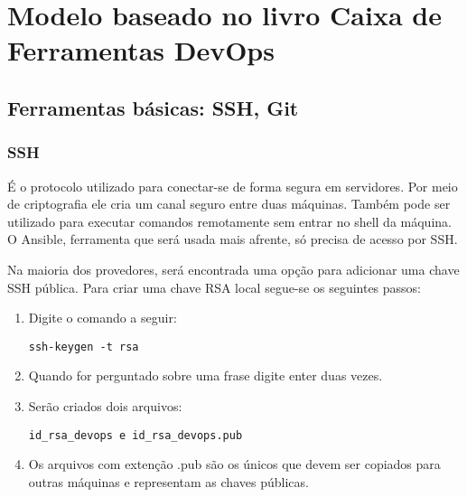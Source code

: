 

 

\section{Modelo baseado no livro Caixa de Ferramentas DevOps}

\subsection{Ferramentas básicas: SSH, Git}

\subsubsection{SSH}

É o protocolo utilizado para conectar-se de forma 
segura em servidores. Por meio de criptografia ele 
cria um canal seguro entre duas máquinas. Também 
pode ser utilizado para executar comandos 
remotamente sem entrar no shell da máquina.
O Ansible, ferramenta que será usada mais afrente, 
só precisa de acesso por SSH.

Na maioria dos provedores, será encontrada uma 
opção para adicionar uma chave SSH pública.
Para criar uma chave RSA local segue-se os 
seguintes passos:
 \begin{enumerate}
   \item Digite o comando a seguir:
	
      \begin{lstlisting}
ssh-keygen -t rsa
      \end{lstlisting}
   
   \item Quando for perguntado sobre uma frase digite 
      enter duas vezes.
    \item Serão criados dois arquivos:
    \begin{lstlisting}
id_rsa_devops e id_rsa_devops.pub
    \end{lstlisting}
    
    \item Os arquivos com extenção .pub são os únicos 
	  que devem ser copiados para outras máquinas 
	  e representam as chaves públicas.

 \end{enumerate} 
